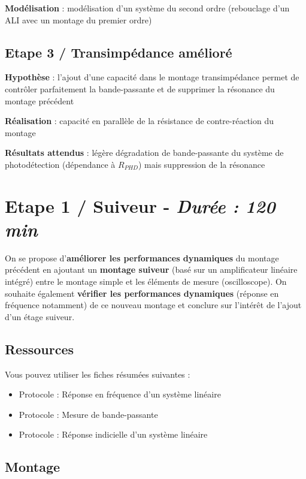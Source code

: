 \textbf{Modélisation} : modélisation d'un système du second ordre (rebouclage d'un ALI avec un montage du premier ordre)

\subsection{Etape 3 / Transimpédance amélioré}

\textbf{Hypothèse} : l'ajout d'une capacité dans le montage transimpédance permet de contrôler parfaitement la bande-passante et de supprimer la résonance du montage précédent

\textbf{Réalisation} : capacité en parallèle de la résistance de contre-réaction du montage

\textbf{Résultats attendus} : légère dégradation de bande-passante du système de photodétection (dépendance à $R_{PHD}$) mais suppression de la résonance


\clearpage
\section{Etape 1 / Suiveur - \textit{Durée : 120 min}}

On se propose d'\textbf{améliorer les performances dynamiques} du montage précédent en ajoutant un \textbf{montage suiveur} (basé sur un amplificateur linéaire intégré) entre le montage simple et les éléments de mesure (oscilloscope). On souhaite également \textbf{vérifier les performances dynamiques} (réponse en fréquence notamment) de ce nouveau montage et conclure sur l'intérêt de l'ajout 
d'un étage suiveur.

\subsection{Ressources}

Vous pouvez utiliser les fiches résumées suivantes : 

\begin{itemize}	
	\item Protocole : Réponse en fréquence d'un système linéaire
	\item Protocole : Mesure de bande-passante
	\item Protocole : Réponse indicielle d'un système linéaire
\end{itemize}


\subsection{Montage}

